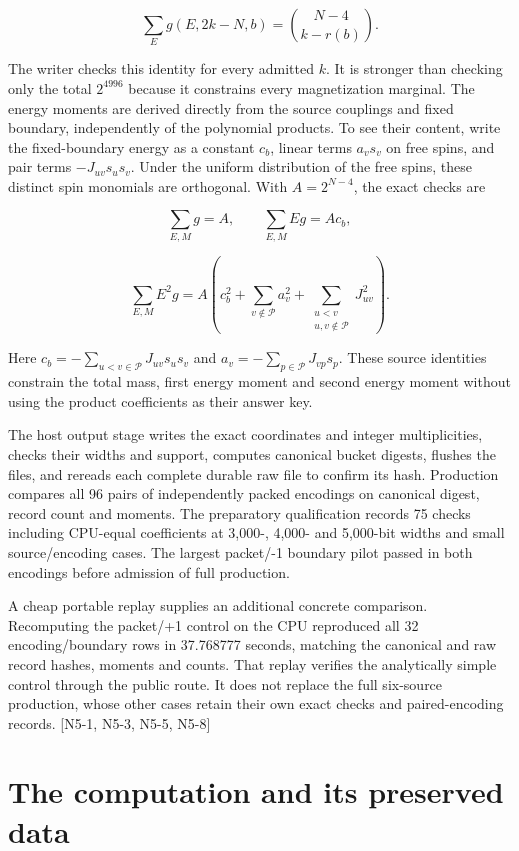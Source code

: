 \[\sum_E g(E,2k-N,b)=\binom{N-4}{k-r(b)}.\]

The writer checks this identity for every admitted \(k\). It is stronger than checking only the total \(2^{4996}\) because it constrains every magnetization marginal. The energy moments are derived directly from the source couplings and fixed boundary, independently of the polynomial products. To see their content, write the fixed-boundary energy as a constant \(c_b\), linear terms \(a_v s_v\) on free spins, and pair terms \(-J_{uv}s_us_v\). Under the uniform distribution of the free spins, these distinct spin monomials are orthogonal. With \(A=2^{N-4}\), the exact checks are

\[\sum_{E,M}g=A,\qquad \sum_{E,M}Eg=A c_b,\]

\[\sum_{E,M}E^2g=A\left(c_b^2+\sum_{v\notin\mathcal P}a_v^2+\sum_{\substack{u<v\\u,v\notin\mathcal P}}J_{uv}^2\right).\]

Here \(c_b=-\sum_{u<v\in\mathcal P}J_{uv}s_us_v\) and \(a_v=-\sum_{p\in\mathcal P}J_{vp}s_p\). These source identities constrain the total mass, first energy moment and second energy moment without using the product coefficients as their answer key.

The host output stage writes the exact coordinates and integer multiplicities, checks their widths and support, computes canonical bucket digests, flushes the files, and rereads each complete durable raw file to confirm its hash. Production compares all 96 pairs of independently packed encodings on canonical digest, record count and moments. The preparatory qualification records 75 checks including CPU-equal coefficients at 3,000-, 4,000- and 5,000-bit widths and small source/encoding cases. The largest packet/-1 boundary pilot passed in both encodings before admission of full production.

A cheap portable replay supplies an additional concrete comparison. Recomputing the packet/+1 control on the CPU reproduced all 32 encoding/boundary rows in 37.768777 seconds, matching the canonical and raw record hashes, moments and counts. That replay verifies the analytically simple control through the public route. It does not replace the full six-source production, whose other cases retain their own exact checks and paired-encoding records. {[}N5-1, N5-3, N5-5, N5-8{]}

\section{The computation and its preserved data}\label{the-computation-and-its-preserved-data}

